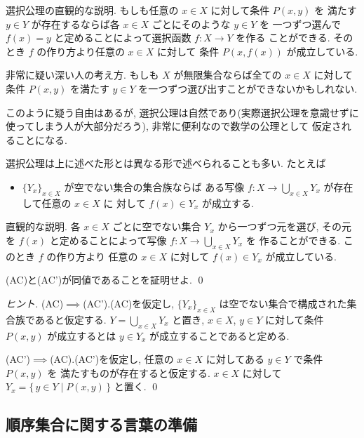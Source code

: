 \documentclass[12pt,twoside]{jarticle}
\begin{document}
選択公理の直観的な説明. もしも任意の $x\in X$ に対して条件 $P(x,y)$ を
満たす $y\in Y$ が存在するならば各 $x\in X$ ごとにそのような $y\in Y$ を
一つずつ選んで $f(x)=y$ と定めることによって選択函数 $f:X\to Y$ を作る
ことができる. そのとき $f$ の作り方より任意の $x\in X$ に対して
条件 $P(x,f(x))$ が成立している.

非常に疑い深い人の考え方. もしも $X$ が無限集合ならば全ての $x\in X$ に対して
条件 $P(x,y)$ を満たす $y\in Y$ を一つずつ選び出すことができないかもしれない.

このように疑う自由はあるが, 選択公理は自然であり(実際選択公理を意識せずに
使ってしまう人が大部分だろう), 非常に便利なので数学の公理として
仮定されることになる.

選択公理は上に述べた形とは異なる形で述べられることも多い. たとえば
\begin{itemize}
\item[(AC')] $\{Y_x\}_{x\in X}$ が空でない集合の集合族ならば
  ある写像 $f:X\to \bigcup_{x\in X}Y_x$ が存在して任意の $x\in X$ に
  対して $f(x)\in Y_x$ が成立する.
\end{itemize}
直観的な説明. 各 $x\in X$ ごとに空でない集合 $Y_x$ から一つずつ元を選び,
その元を $f(x)$ と定めることによって写像 $f:X\to \bigcup_{x\in X}Y_x$ を
作ることができる. このとき $f$ の作り方より
任意の $x\in X$ に対して $f(x)\in Y_x$ が成立している.

\begin{question}[5点]
  (AC)と(AC')が同値であることを証明せよ. \qed
\end{question}

\begin{proof}[ヒント]
  (AC)$\implies$(AC').\enspace (AC)を仮定し, 
  $\{Y_x\}_{x\in X}$ は空でない集合で構成された集合族であると仮定する.
  $Y=\bigcup_{x\in X} Y_x$ と置き, 
  $x\in X$, $y\in Y$ に対して条件 $P(x,y)$ が成立するとは
  $y\in Y_x$ が成立することであると定める.

  (AC')$\implies$(AC).\enspace (AC')を仮定し, 
  任意の $x\in X$ に対してある $y\in Y$ で条件 $P(x,y)$ を
  満たすものが存在すると仮定する.
  $x\in X$ に対して $Y_x=\{\,y\in Y\mid P(x,y)\,\}$ と置く.
  \qed
\end{proof}


\subsection{順序集合に関する言葉の準備}
\end{document}
